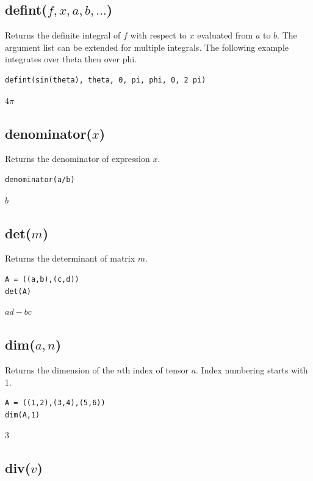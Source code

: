\subsection*{defint($f,x,a,b,\ldots$)}

Returns the definite integral of $f$ with respect to $x$
evaluated from $a$ to $b$.
The argument list can be extended for multiple integrals.
The following example integrates over theta then over phi.

{\color{blue}
\begin{verbatim}
defint(sin(theta), theta, 0, pi, phi, 0, 2 pi)
\end{verbatim}
}

$4\pi$

\subsection*{denominator($x$)}

Returns the denominator of expression $x$.

{\color{blue}
\begin{verbatim}
denominator(a/b)
\end{verbatim}
}

$b$

\subsection*{det($m$)}

Returns the determinant of matrix $m$.

{\color{blue}
\begin{verbatim}
A = ((a,b),(c,d))
det(A)
\end{verbatim}
}

$a d - b c$

\subsection*{dim($a,n$)}

Returns the dimension of the $n$th index of tensor $a$.
Index numbering starts with 1.

{\color{blue}
\begin{verbatim}
A = ((1,2),(3,4),(5,6))
dim(A,1)
\end{verbatim}
}

$3$

\subsection*{div($v$)}

